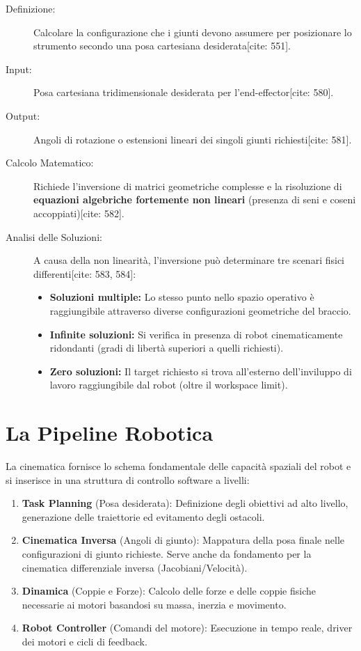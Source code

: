 \begin{description}
    \item[Definizione:] Calcolare la configurazione che i giunti devono assumere per posizionare lo strumento secondo una posa cartesiana desiderata[cite: 551].
    \item[Input:] Posa cartesiana tridimensionale desiderata per l'end-effector[cite: 580].
    \item[Output:] Angoli di rotazione o estensioni lineari dei singoli giunti richiesti[cite: 581].
    \item[Calcolo Matematico:] Richiede l'inversione di matrici geometriche complesse e la risoluzione di \textbf{equazioni algebriche fortemente non lineari} (presenza di seni e coseni accoppiati)[cite: 582].
    \item[Analisi delle Soluzioni:] A causa della non linearità, l'inversione può determinare tre scenari fisici differenti[cite: 583, 584]:
          \begin{itemize}
              \item \textbf{Soluzioni multiple:} Lo stesso punto nello spazio operativo è raggiungibile attraverso diverse configurazioni geometriche del braccio.
              \item \textbf{Infinite soluzioni:} Si verifica in presenza di robot cinematicamente ridondanti (gradi di libertà superiori a quelli richiesti).
              \item \textbf{Zero soluzioni:} Il target richiesto si trova all'esterno dell'inviluppo di lavoro raggiungibile dal robot (oltre il workspace limit).
          \end{itemize}
\end{description}

\section{La Pipeline Robotica}
La cinematica fornisce lo schema fondamentale delle capacità spaziali del robot e si inserisce in una struttura di controllo software a livelli:
\begin{enumerate}
    \item \textbf{Task Planning} (Posa desiderata): Definizione degli obiettivi ad alto livello, generazione delle traiettorie ed evitamento degli ostacoli.
    \item \textbf{Cinematica Inversa} (Angoli di giunto): Mappatura della posa finale nelle configurazioni di giunto richieste. Serve anche da fondamento per la cinematica differenziale inversa (Jacobiani/Velocità).
    \item \textbf{Dinamica} (Coppie e Forze): Calcolo delle forze e delle coppie fisiche necessarie ai motori basandosi su massa, inerzia e movimento.
    \item \textbf{Robot Controller} (Comandi del motore): Esecuzione in tempo reale, driver dei motori e cicli di feedback.
\end{enumerate}